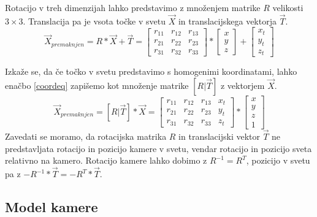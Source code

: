 \documentclass[a4paper, 12pt]{book}
\begin{document}
Rotacijo v treh dimenzijah lahko predstavimo z množenjem matrike $R$ velikosti $3 \times 3$. Translacija pa je vsota točke v svetu $\vec{X}$ in translacijskega vektorja $\vec{T}$.
\begin{equation}
\vec{X}_{premaknjen} = R * \vec{X} + \vec{T} = 
\begin{bmatrix}
r_{11} & r_{12} & r_{13} \\
r_{21} & r_{22} & r_{23} \\
r_{31} & r_{32} & r_{33}
\end{bmatrix}
* 
\begin{bmatrix}
x \\
y \\
z 
\end{bmatrix}
+
\begin{bmatrix}
x_t \\
y_t \\
z_t 
\end{bmatrix}
\label{coordeq}
\end{equation}

Izkaže se, da če točko v svetu predstavimo s homogenimi koordinatami, lahko enačbo \eqref{coordeq} zapišemo kot množenje matrike $[R | \vec{T}]$ z vektorjem $\vec{X}$.
\begin{equation}
\vec{X}_{premaknjen} = [R|\vec{T}] * \vec{X} = 
\begin{bmatrix}
r_{11} & r_{12} & r_{13} & x_t\\
r_{21} & r_{22} & r_{23} & y_t\\
r_{31} & r_{32} & r_{33} & z_t
\end{bmatrix}
* 
\begin{bmatrix}
x \\
y \\
z \\
1
\end{bmatrix}
\label{coordeq}
\end{equation}
Zavedati se moramo, da rotacijska matrika $R$ in translacijski vektor $\vec{T}$ ne predstavljata rotacijo in pozicijo kamere v svetu, vendar rotacijo in pozicijo sveta relativno na kamero. Rotacijo kamere lahko dobimo z $R^{-1} = R^T$, pozicijo v svetu pa z $-R^{-1} * \vec{T} = -R^T * \vec{T}$.

\subsection{Model kamere}
\end{document}
